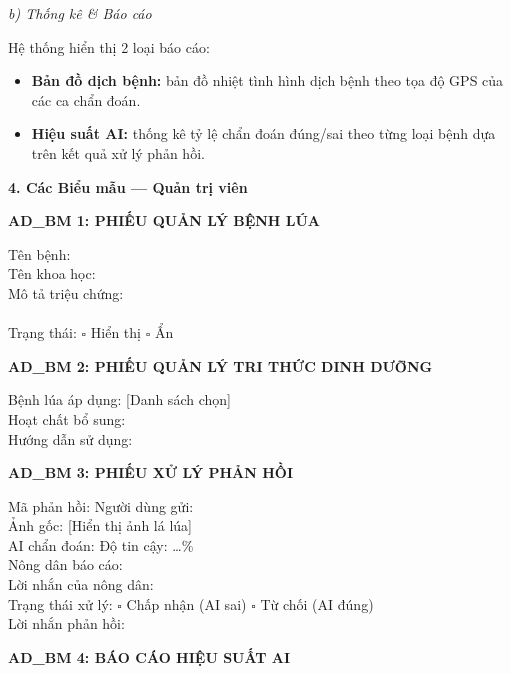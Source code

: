 ﻿\documentclass[12pt,a4paper]{article}
\begin{document}
\noindent\textit{b) Thống kê \& Báo cáo}

Hệ thống hiển thị 2 loại báo cáo:
\begin{itemize}
    \item \textbf{Bản đồ dịch bệnh:} bản đồ nhiệt tình hình dịch bệnh theo tọa độ GPS của các ca chẩn đoán.
    \item \textbf{Hiệu suất AI:} thống kê tỷ lệ chẩn đoán đúng/sai theo từng loại bệnh dựa trên kết quả xử lý phản hồi.
\end{itemize}

\vspace{0.3cm}
\textbf{4. Các Biểu mẫu --- Quản trị viên}

\vspace{0.3cm}
\noindent\textbf{AD\_BM 1: PHIẾU QUẢN LÝ BỆNH LÚA}

\noindent Tên bệnh: \dotfill \\
Tên khoa học: \dotfill \\
Mô tả triệu chứng: \dotfill \\
\dotfill \\
Trạng thái: $\square$ Hiển thị \quad $\square$ Ẩn

\vspace{0.3cm}
\noindent\textbf{AD\_BM 2: PHIẾU QUẢN LÝ TRI THỨC DINH DƯỠNG}

\noindent Bệnh lúa áp dụng: [Danh sách chọn] \dotfill \\
Hoạt chất bổ sung: \dotfill \\
Hướng dẫn sử dụng: \dotfill \\
\dotfill

\vspace{0.3cm}
\noindent\textbf{AD\_BM 3: PHIẾU XỬ LÝ PHẢN HỒI}

\noindent Mã phản hồi: \dotfill \quad Người dùng gửi: \dotfill \\
Ảnh gốc: [Hiển thị ảnh lá lúa] \\
AI chẩn đoán: \dotfill \quad Độ tin cậy: \dots\% \\
Nông dân báo cáo: \dotfill \\
Lời nhắn của nông dân: \dotfill \\
Trạng thái xử lý: $\square$ Chấp nhận (AI sai) \quad $\square$ Từ chối (AI đúng) \\
Lời nhắn phản hồi: \dotfill \\
\dotfill

\vspace{0.3cm}
\noindent\textbf{AD\_BM 4: BÁO CÁO HIỆU SUẤT AI}
\end{document}

